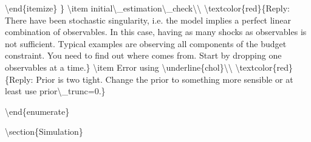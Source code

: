 \documentclass[10pt,math=newtx,citestyle=gb7714-2015,bibstyle=gb7714-2015]{elegantbook}
\begin{document}
	\textbackslash{}end\{itemize\}
	\}
	\textbackslash{}item initial\textbackslash{}\_estimation\textbackslash{}\_check\textbackslash{}\textbackslash{}
	\textbackslash{}textcolor\{red\}\{Reply: There have been stochastic singularity, i.e. the model implies a perfect linear combination of observables. In this case, having as many shocks as observables is not sufficient. Typical examples are observing all components of the budget constraint. You need to find out where comes from. Start by dropping one observables at a time.\}
	\textbackslash{}item Error using \textbackslash{}underline\{chol\}\textbackslash{}\textbackslash{}
	\textbackslash{}textcolor\{red\}\{Reply: Prior is two tight. Change the prior to something more sensible or at least use prior\textbackslash{}\_trunc=0.\}
	
	
	
	
	\textbackslash{}end\{enumerate\}
	
	\textbackslash{}section\{Simulation\}
	
\end{document}
